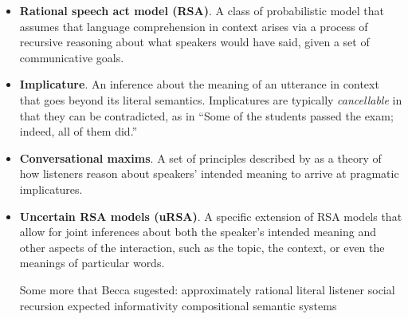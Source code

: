 \documentclass[]{elsarticle}
\begin{document}
\begin{itemize}
\item \textbf{Rational speech act model (RSA)}. A class of probabilistic model that assumes that language comprehension in context arises via a process of
  recursive reasoning about what speakers would have said, given a set
  of communicative goals.

\item \textbf{Implicature}. An inference about the meaning of an utterance in context that goes beyond its literal semantics. Implicatures are typically \emph{cancellable} in that they can be contradicted, as in ``Some of the students passed the exam; indeed, all of them did.''

\item \textbf{Conversational maxims}. A set of principles described by \citet{grice1975} as a theory of how listeners reason about speakers' intended meaning to arrive at pragmatic implicatures.

\item \textbf{Uncertain RSA models (uRSA)}. A specific extension of RSA models that allow for joint inferences about both the speaker's intended meaning and other aspects of the interaction, such as the topic, the context, or even the meanings of particular words.

Some more that Becca sugested:
approximately rational
literal listener 
social recursion
expected informativity
compositional semantic systems



\end{itemize}
\end{document}
